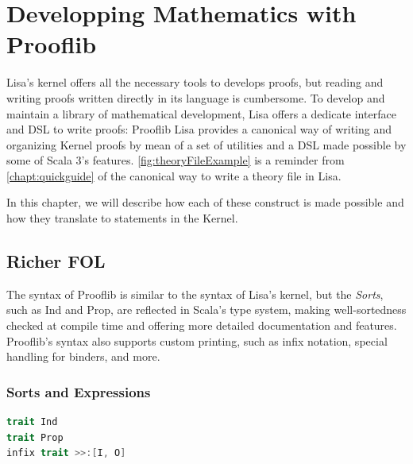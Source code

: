 \chapter{Developping Mathematics with Prooflib}
\label{chapt:prooflib}
Lisa's kernel offers all the necessary tools to develops proofs, but  reading and writing proofs written directly in its language is cumbersome.
To develop and maintain a library of mathematical development, Lisa offers a dedicate interface and DSL to write proofs: Prooflib
Lisa provides a canonical way of writing and organizing Kernel proofs by mean of a set of utilities and a DSL made possible by some of Scala 3's features.
\autoref{fig:theoryFileExample} is a reminder from \autoref{chapt:quickguide} of the canonical way to write a theory file in Lisa.

\begin{figure}
\end{figure}

In this chapter, we will describe how each of these construct is made possible and how they translate to statements in the Kernel.

\section{Richer FOL}

The syntax of Prooflib is similar to the syntax of Lisa's kernel, but the \textit{Sorts}, such as Ind and Prop, are reflected in Scala's type system, making well-sortedness checked at compile time and offering more detailed documentation and features. Prooflib's syntax also supports custom printing, such as infix notation, special handling for binders, and more.

\subsection{Sorts and Expressions}

\begin{definition}[Sorts]\phantom{.}
  \begin{lstlisting}[language=scala]
trait Ind
trait Prop
infix trait >>:[I, O]
  \end{lstlisting}

\end{definition}

